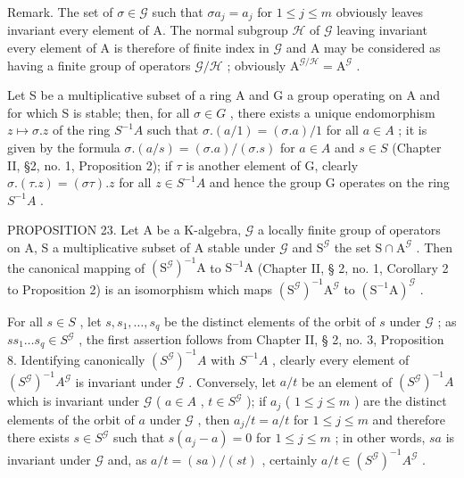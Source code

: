 Remark. The set of \(\sigma \in \mathcal{G}\) such that \(\sigma a_{j} = a_{j}\) for \(1 \leqslant j \leqslant m\) obviously leaves invariant every element of A. The normal subgroup \(\mathcal{H}\) of \(\mathcal{G}\) leaving invariant every element of A is therefore of finite index in \(\mathcal{G}\) and A may be considered as having a finite group of operators \(\mathcal{G}/\mathcal{H}\) ; obviously \(\mathrm{A}^{\mathcal{G}/\mathcal{H}} = \mathrm{A}^{\mathcal{G}}\) .

Let S be a multiplicative subset of a ring A and G a group operating on A and for which S is stable; then, for all \(\sigma\in G\) , there exists a unique endomorphism \(z\mapsto\sigma.z\) of the ring \(S^{-1}A\) such that \(\sigma.(a/1)=(\sigma.a)/1\) for all \(a\in A\) ; it is given by the formula \(\sigma.(a/s)=(\sigma.a)/( \sigma.s)\) for \(a\in A\) and \(s\in S\) (Chapter II, §2, no. 1, Proposition 2); if \(\tau\) is another element of G, clearly \(\sigma.(\tau.z)=(\sigma\tau).z\) for all \(z\in S^{-1}A\) and hence the group G operates on the ring \(S^{-1}A\) .

PROPOSITION 23. Let A be a K-algebra, \(\mathcal{G}\) a locally finite group of operators on A, S a multiplicative subset of A stable under \(\mathcal{G}\) and \(\mathrm{S}^{\mathcal{G}}\) the set \(\mathrm{S} \cap \mathrm{A}^{\mathcal{G}}\) . Then the canonical mapping of \((\mathrm{S}^{\mathcal{G}})^{-1}\mathrm{A}\) to \(\mathrm{S}^{-1}\mathrm{A}\) (Chapter II, § 2, no. 1, Corollary 2 to Proposition 2) is an isomorphism which maps \((\mathrm{S}^{\mathcal{G}})^{-1}\mathrm{A}^{\mathcal{G}}\) to \((\mathrm{S}^{-1}\mathrm{A})^{\mathcal{G}}\) .

For all \(s \in S\) , let \(s, s_1, \ldots, s_q\) be the distinct elements of the orbit of \(s\) under \(\mathcal{G}\) ; as \(ss_1 \ldots s_q \in S^{\mathcal{G}}\) , the first assertion follows from Chapter II, § 2, no. 3, Proposition 8. Identifying canonically \((S^{\mathcal{G}})^{-1}A\) with \(S^{-1}A\) , clearly every element of \((S^{\mathcal{G}})^{-1}A^{\mathcal{G}}\) is invariant under \(\mathcal{G}\) . Conversely, let \(a/t\) be an element of \((S^{\mathcal{G}})^{-1}A\) which is invariant under \(\mathcal{G}\) ( \(a \in A\) , \(t \in S^{\mathcal{G}}\) ); if \(a_j\) ( \(1 \leqslant j \leqslant m\) ) are the distinct elements of the orbit of \(a\) under \(\mathcal{G}\) , then \(a_j/t = a/t\) for \(1 \leqslant j \leqslant m\) and therefore there exists \(s \in S^{\mathcal{G}}\) such that \(s(a_j - a) = 0\) for \(1 \leqslant j \leqslant m\) ; in other words, \(sa\) is invariant under \(\mathcal{G}\) and, as \(a/t = (sa)/(st)\) , certainly \(a/t \in (S^{\mathcal{G}})^{-1}A^{\mathcal{G}}\) .

